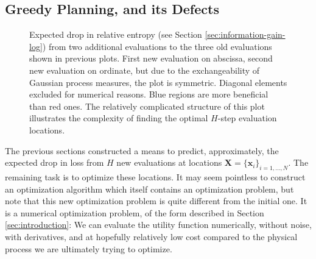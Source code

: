 \documentclass[twoside,11pt]{article}
\newcommand{\vx}{\vec{x}}
\newcommand{\vX}{\vec{X}}
\renewcommand{\vec}{\boldsymbol}
\newcommand{\inputTikZ}[1]{%
 }
\newcommand{\inputTikZ}[1]{%
   \beginpgfgraphicnamed{#1-external}%
   \endpgfgraphicnamed%
 }
\begin{document}
\subsection{Greedy Planning, and its Defects}
\label{sec:defect-greedy-plann}

\begin{figure}
  \centering
  \inputTikZ{figures/dH2}
  \caption{Expected drop in relative entropy (see Section
    \ref{sec:information-gain-log}) from two additional evaluations to
    the three old evaluations shown in previous plots. First new
    evaluation on abscissa, second new evaluation on ordinate, but due
    to the exchangeability of Gaussian process measures, the plot is
    symmetric. Diagonal elements excluded for numerical reasons. Blue
    regions are more beneficial than red ones. The relatively
    complicated structure of this plot illustrates the complexity of
    finding the optimal $H$-step evaluation locations.}
  \label{fig:dh2}
\end{figure}

The previous sections constructed a means to predict, approximately,
the expected drop in loss from $H$ new evaluations at locations
$\vX=\{\vx_i\}_{i=1,\dots,N}$. The remaining task is to optimize these
locations. It may seem pointless to construct an optimization
algorithm which itself contains an optimization problem, but note that
this new optimization problem is quite different from the initial
one. It is a numerical optimization problem, of the form described in
Section \ref{sec:introduction}: We can evaluate the utility function
numerically, without noise, with derivatives, and at hopefully
relatively low cost compared to the physical process we are ultimately
trying to optimize.
\end{document}
